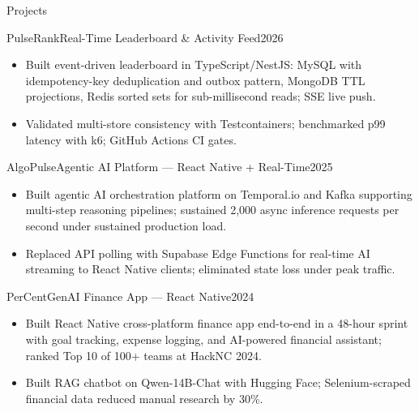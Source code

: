 \documentclass[]{mcdowellcv}
\begin{document}
\begin{cvsection}{Projects}
  \begin{cvsubsection}{PulseRank}{Real-Time Leaderboard \& Activity Feed}{2026}
    \begin{itemize}
      \item Built event-driven leaderboard in TypeScript/NestJS: MySQL with idempotency-key deduplication and outbox pattern, MongoDB TTL projections, Redis sorted sets for sub-millisecond reads; SSE live push.
      \item Validated multi-store consistency with Testcontainers; benchmarked p99 latency with k6; GitHub Actions CI gates.
    \end{itemize}
    \vspace{-1.5pt}
  \end{cvsubsection}

  \begin{cvsubsection}{AlgoPulse}{Agentic AI Platform --- React Native + Real-Time}{2025}
    \begin{itemize}
      \item Built agentic AI orchestration platform on Temporal.io and Kafka supporting multi-step reasoning pipelines; sustained 2,000 async inference requests per second under sustained production load.
      \item Replaced API polling with Supabase Edge Functions for real-time AI streaming to React Native clients; eliminated state loss under peak traffic.
    \end{itemize}
    \vspace{-1.5pt}
  \end{cvsubsection}

  \begin{cvsubsection}{PerCent}{GenAI Finance App --- React Native}{2024}
    \begin{itemize}
      \item Built React Native cross-platform finance app end-to-end in a 48-hour sprint with goal tracking, expense logging, and AI-powered financial assistant; ranked Top 10 of 100+ teams at HackNC 2024.
      \item Built RAG chatbot on Qwen-14B-Chat with Hugging Face; Selenium-scraped financial data reduced manual research by 30\%.
    \end{itemize}
  \end{cvsubsection}
\end{cvsection}
\end{document}
